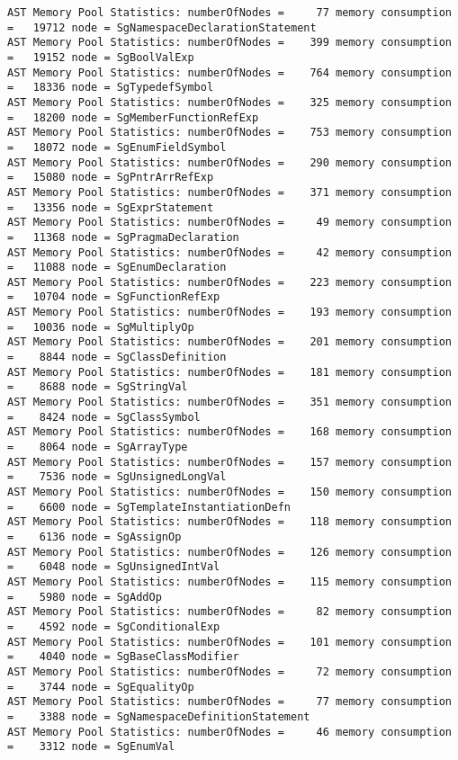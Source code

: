 {{\begin{verbatim}
AST Memory Pool Statistics: numberOfNodes =     77 memory consumption =   19712 node = SgNamespaceDeclarationStatement
AST Memory Pool Statistics: numberOfNodes =    399 memory consumption =   19152 node = SgBoolValExp
AST Memory Pool Statistics: numberOfNodes =    764 memory consumption =   18336 node = SgTypedefSymbol
AST Memory Pool Statistics: numberOfNodes =    325 memory consumption =   18200 node = SgMemberFunctionRefExp
AST Memory Pool Statistics: numberOfNodes =    753 memory consumption =   18072 node = SgEnumFieldSymbol
AST Memory Pool Statistics: numberOfNodes =    290 memory consumption =   15080 node = SgPntrArrRefExp
AST Memory Pool Statistics: numberOfNodes =    371 memory consumption =   13356 node = SgExprStatement
AST Memory Pool Statistics: numberOfNodes =     49 memory consumption =   11368 node = SgPragmaDeclaration
AST Memory Pool Statistics: numberOfNodes =     42 memory consumption =   11088 node = SgEnumDeclaration
AST Memory Pool Statistics: numberOfNodes =    223 memory consumption =   10704 node = SgFunctionRefExp
AST Memory Pool Statistics: numberOfNodes =    193 memory consumption =   10036 node = SgMultiplyOp
AST Memory Pool Statistics: numberOfNodes =    201 memory consumption =    8844 node = SgClassDefinition
AST Memory Pool Statistics: numberOfNodes =    181 memory consumption =    8688 node = SgStringVal
AST Memory Pool Statistics: numberOfNodes =    351 memory consumption =    8424 node = SgClassSymbol
AST Memory Pool Statistics: numberOfNodes =    168 memory consumption =    8064 node = SgArrayType
AST Memory Pool Statistics: numberOfNodes =    157 memory consumption =    7536 node = SgUnsignedLongVal
AST Memory Pool Statistics: numberOfNodes =    150 memory consumption =    6600 node = SgTemplateInstantiationDefn
AST Memory Pool Statistics: numberOfNodes =    118 memory consumption =    6136 node = SgAssignOp
AST Memory Pool Statistics: numberOfNodes =    126 memory consumption =    6048 node = SgUnsignedIntVal
AST Memory Pool Statistics: numberOfNodes =    115 memory consumption =    5980 node = SgAddOp
AST Memory Pool Statistics: numberOfNodes =     82 memory consumption =    4592 node = SgConditionalExp
AST Memory Pool Statistics: numberOfNodes =    101 memory consumption =    4040 node = SgBaseClassModifier
AST Memory Pool Statistics: numberOfNodes =     72 memory consumption =    3744 node = SgEqualityOp
AST Memory Pool Statistics: numberOfNodes =     77 memory consumption =    3388 node = SgNamespaceDefinitionStatement
AST Memory Pool Statistics: numberOfNodes =     46 memory consumption =    3312 node = SgEnumVal

\end{verbatim}}}
